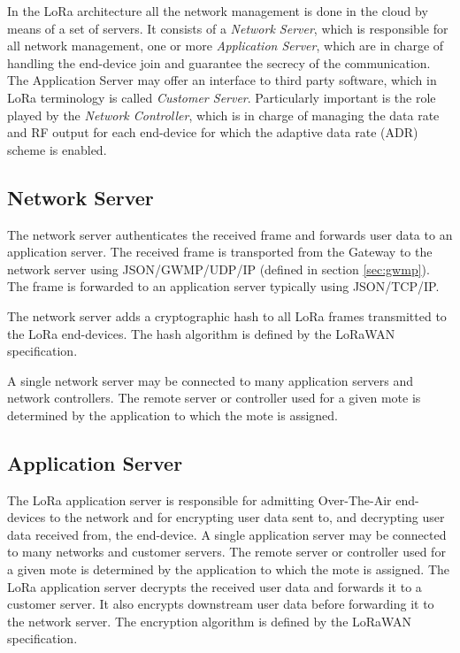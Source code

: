 In the LoRa architecture all the network management is done in the cloud by means of a set of servers. It consists of a \emph{Network Server}, which is responsible for all network management, one or more \emph{Application Server}, which are in charge of handling the end-device join and guarantee the secrecy of the communication. The Application Server may offer an interface to third party software, which in LoRa terminology is called \emph{Customer Server}.
Particularly important is the role played by the \emph{Network Controller}, which is in charge of managing the data rate and RF output for each end-device for which the adaptive data rate (ADR) scheme is enabled.

\subsection{Network Server}

The network server authenticates the received frame and forwards user data to an application server. The received frame is transported from the Gateway to the network server using JSON/GWMP/UDP/IP (defined in section \ref{sec:gwmp}). The frame is forwarded to an application server typically using JSON/TCP/IP.

The network server adds a cryptographic hash to all LoRa frames transmitted to the LoRa end-devices. The hash algorithm is defined by the LoRaWAN specification. \cite{lorawanspec}

A single network server may be connected to many application servers and network controllers. The remote server or controller used for a given mote is determined by the application to which the mote is assigned.

\subsection{Application Server}
The LoRa application server is responsible for admitting Over-The-Air end-devices to the network and for encrypting user data sent to, and decrypting user data received from, the end-device.
A single application server may be connected to many networks and customer servers. The remote server or controller used for a given mote is determined by the application to which the mote is assigned.
The LoRa application server decrypts the received user data and forwards it to a customer server. It also encrypts downstream user data before forwarding it to the network server. The encryption algorithm is defined by the LoRaWAN specification. \cite{lorawanspec}



